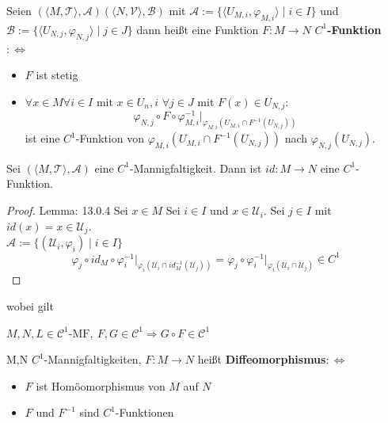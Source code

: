 {
    Seien $(\langle M, \mathcal{T} \rangle, \mathcal{A})(\langle N, \mathcal{V}\rangle, \mathcal{B})$ 
    mit 
    $\mathcal{A} := \{\langle U_{M,i}, \varphi_{M,i} \rangle \mid i \in I\}$ und
    $\mathcal{B}:= \{\langle U_{N,j}, \varphi_{N,j} \rangle \mid j \in J\}$
    dann heißt eine Funktion $F: M \to N$
\textbf{$C^1$-Funktion} $:\Leftrightarrow$
\begin{itemize}
    \item $F$ ist stetig
    \item $\forall x \in M \forall i \in I$ mit $x \in U_n,i$
    $\forall j \in J$ mit $F(x) \in U_{N,j}$:
    $$\varphi_{N,j} \circ F \circ \varphi_{M,i}^{-1}\big|_{\varphi_{M,i}
    (U_{M,i} \cap F^{-1}(U_{N,j}))}
    $$ ist eine $C^1$-Funktion von $\varphi_{M,i}(U_{M,i} \cap F^{-1}(U_{N,j}))$
    nach $\varphi_{N,j}(U_{N,j})$.
\end{itemize}   
}
\mlenma{}
{
    Sei $(\langle M, \mathcal{T} \rangle, \mathcal{A})$ eine $C^1$-Mannigfaltigkeit.
    Dann ist $id:M\to N$ eine $C^1$-Funktion. 
}
\begin{proof}{Lemma: 13.0.4}
    Sei $x \in M$ Sei $i \in I$ und $x \in \mathcal{U}_i$. Sei $j \in I$
    mit $id(x)=x \in \mathcal{U}_j$.\\
    $\mathcal{A}:=\{(\mathcal{U}_i, \varphi_i) \mid i \in I\}$\\
    $$ \varphi_j \circ id_M \circ \varphi_i^{-1}\big|_{\varphi_i(\mathcal{U}_i \cap id_M^{-1}(\mathcal{U}_j))}=
    \varphi_j \circ \varphi_i^{-1}\big|_{\varphi_i(\mathcal{U}_i \cap \mathcal{U}_j)} \in C^1
    $$
\end{proof}

wobei gilt
$M, N, L \in \mathcal{C}^1\text{-MF}, \ F, G \in \mathcal{C}^1 
\Rightarrow G \circ F \in \mathcal{C}^1$


{
    M,N $C^1$-Mannigfaltigkeiten, $F: M \to N$ heißt 
    \textbf{Diffeomorphismus}$:\Leftrightarrow$
    \begin{itemize}
        \item $F$ ist Homöomorphismus von $M$ auf $N$
        \item $F$ und $F^{-1}$ sind $C^1$-Funktionen
    \end{itemize}
}

